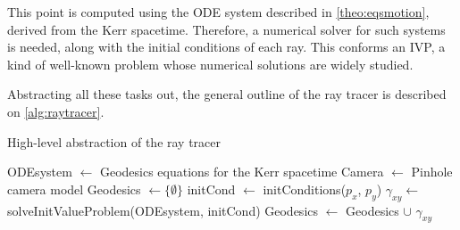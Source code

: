 This point is computed using the \ac{ODE} system described in \autoref{theo:eqsmotion}, derived from the Kerr spacetime. Therefore, a numerical solver for such systems is needed, along with the initial conditions of each ray. This conforms an \ac{IVP}, a kind of well-known problem whose numerical solutions are widely studied.

Abstracting all these tasks out, the general outline of the ray tracer is described on \autoref{alg:raytracer}.

\begin{algorithm}
	\caption{High-level abstraction of the ray tracer}
	\label{alg:raytracer}
	\begin{algorithmic}[1]
		\State ODEsystem $\gets$ Geodesics equations for the Kerr spacetime
		\State Camera $\gets$ Pinhole camera model
		\State Geodesics $\gets \{\emptyset\}$
			\State initCond $\gets$ initConditions($p_x$, $p_y$)
			\State $\gamma_{xy} \gets$ solveInitValueProblem(ODEsystem, initCond)
			\State Geodesics $\gets$ Geodesics $\cup$ $\gamma_{xy}$
		\EndFor
	\EndFunction
	\end{algorithmic}
\end{algorithm}


